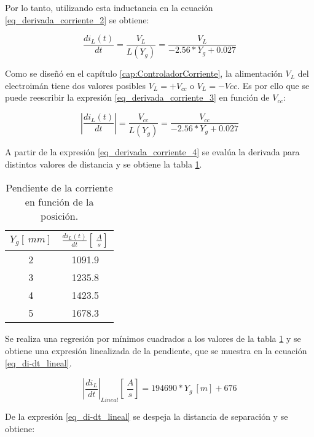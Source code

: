 Por lo tanto, utilizando esta inductancia en la ecuación \ref{eq_derivada_corriente_2} se obtiene:

\begin{equation} \label{eq_derivada_corriente_3}
	\frac{di_L(t)}{dt}= \frac{V_L}{L(Y_g)}=\frac{V_L}{-2.56*Y_{g}+0.027}
\end{equation}

Como se diseñó en el capítulo \ref{cap:ControladorCorriente}, la alimentación $V_L$ del electroimán tiene dos valores posibles $V_L=+V_{cc}$ o $V_L=-V{cc}$. Es por ello que se puede reescribir la expresión \ref{eq_derivada_corriente_3} en función de $V_{cc}$:

\begin{equation} \label{eq_derivada_corriente_4}
	\left|\frac{di_L(t)}{dt}\right|= \frac{V_{cc}}{L(Y_g)}=\frac{V_{cc}}{-2.56*Y_{g}+0.027}
\end{equation}

A partir de la expresión \ref{eq_derivada_corriente_4} se evalúa la derivada para distintos valores de distancia y se obtiene la tabla \ref{tab_derivada_linealizada}.

\begin{table}[H]
	\begin{center}
		\begin{tabular}{| c | c |}
			\hline
			$Y_g[\:mm]$ & $\frac{di_L(t)}{dt} [\:\frac{A}{s}]$\\ \hline
			2 & 1091.9 \\ \hline 
			3 & 1235.8 \\ \hline 
			4 & 1423.5 \\ \hline 
			5 & 1678.3 \\ \hline 
		\end{tabular}
		\caption{Pendiente de la corriente en función de la posición.}
		\label{tab_derivada_linealizada}
	\end{center}
\end{table}

Se realiza una regresión por mínimos cuadrados a los valores de la tabla \ref{tab_derivada_linealizada} y se obtiene una expresión linealizada de la pendiente, que se  muestra en la ecuación \ref{eq_di-dt_lineal}.


\begin{equation} \label{eq_di-dt_lineal}
	{\left|\frac{di_L}{dt}\right|}_{Lineal}[\:\frac{A}{s}]= 194690 * Y_g\:[m]+676
\end{equation}

De la expresión \ref{eq_di-dt_lineal} se despeja la distancia de separación y se obtiene:

